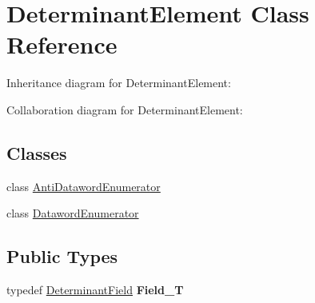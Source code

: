 \hypertarget{classDeterminantElement}{}\section{Determinant\+Element Class Reference}
\label{classDeterminantElement}


Inheritance diagram for Determinant\+Element\+:


Collaboration diagram for Determinant\+Element\+:
\subsection*{Classes}
\begin{DoxyCompactItemize}
\item 
class \hyperlink{classDeterminantElement_1_1AntiDatawordEnumerator}{Anti\+Dataword\+Enumerator}
\item 
class \hyperlink{classDeterminantElement_1_1DatawordEnumerator}{Dataword\+Enumerator}
\end{DoxyCompactItemize}
\subsection*{Public Types}
\begin{DoxyCompactItemize}
\item 
typedef \hyperlink{classDeterminantField}{Determinant\+Field} {\bfseries Field\+\_\+T}\hypertarget{classDeterminantElement_a35ba407ecc76258d039bf7ef1bcefe8a}{}\label{classDeterminantElement_a35ba407ecc76258d039bf7ef1bcefe8a}

\end{DoxyCompactItemize}
